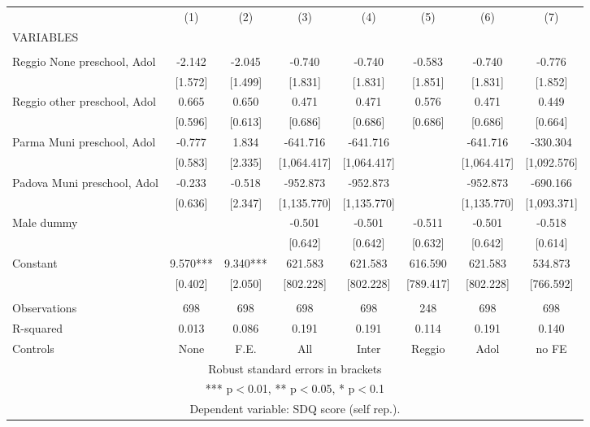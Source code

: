 \begin{tabular}{lccccccc} \hline
 & (1) & (2) & (3) & (4) & (5) & (6) & (7) \\
VARIABLES &  &  &  &  &  &  &  \\ \hline
 &  &  &  &  &  &  &  \\
Reggio None preschool, Adol & -2.142 & -2.045 & -0.740 & -0.740 & -0.583 & -0.740 & -0.776 \\
 & [1.572] & [1.499] & [1.831] & [1.831] & [1.851] & [1.831] & [1.852] \\
Reggio other preschool, Adol & 0.665 & 0.650 & 0.471 & 0.471 & 0.576 & 0.471 & 0.449 \\
 & [0.596] & [0.613] & [0.686] & [0.686] & [0.686] & [0.686] & [0.664] \\
Parma Muni preschool, Adol & -0.777 & 1.834 & -641.716 & -641.716 &  & -641.716 & -330.304 \\
 & [0.583] & [2.335] & [1,064.417] & [1,064.417] &  & [1,064.417] & [1,092.576] \\
Padova Muni preschool, Adol & -0.233 & -0.518 & -952.873 & -952.873 &  & -952.873 & -690.166 \\
 & [0.636] & [2.347] & [1,135.770] & [1,135.770] &  & [1,135.770] & [1,093.371] \\
Male dummy &  &  & -0.501 & -0.501 & -0.511 & -0.501 & -0.518 \\
 &  &  & [0.642] & [0.642] & [0.632] & [0.642] & [0.614] \\
Constant & 9.570*** & 9.340*** & 621.583 & 621.583 & 616.590 & 621.583 & 534.873 \\
 & [0.402] & [2.050] & [802.228] & [802.228] & [789.417] & [802.228] & [766.592] \\
 &  &  &  &  &  &  &  \\
Observations & 698 & 698 & 698 & 698 & 248 & 698 & 698 \\
R-squared & 0.013 & 0.086 & 0.191 & 0.191 & 0.114 & 0.191 & 0.140 \\
 Controls & None & F.E. & All & Inter & Reggio & Adol & no FE \\ \hline
\multicolumn{8}{c}{ Robust standard errors in brackets} \\
\multicolumn{8}{c}{ *** p$<$0.01, ** p$<$0.05, * p$<$0.1} \\
\multicolumn{8}{c}{ Dependent variable: SDQ score (self rep.).} \\
\end{tabular}
